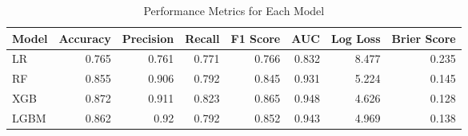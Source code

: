 \begin{table}[H]\centering
\caption{Performance Metrics for Each Model}
\label{Table 3 :performance_metrics}
\begin{tabular}{lrrrrrrr}
\toprule
Model & Accuracy & Precision & Recall & F1 Score & AUC & Log Loss & Brier Score \\
\midrule
LR & 0.765 & 0.761 & 0.771 & 0.766 & 0.832 & 8.477 & 0.235 \\
RF & 0.855 & 0.906 & 0.792 & 0.845 & 0.931 & 5.224 & 0.145 \\
XGB & 0.872 & 0.911 & 0.823 & 0.865 & 0.948 & 4.626 & 0.128 \\
LGBM & 0.862 & 0.92 & 0.792 & 0.852 & 0.943 & 4.969 & 0.138 \\
\bottomrule
\end{tabular}
\end{table}
